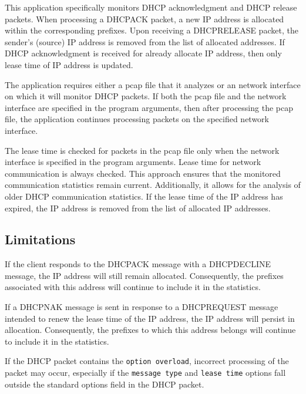 \documentclass[a4paper, 11pt, a4paper]{article}
\begin{document}
\noindent This application specifically monitors DHCP acknowledgment and DHCP release packets. When processing a DHCPACK packet, 
a new IP address is allocated within the corresponding prefixes. Upon receiving a DHCPRELEASE packet, the sender's (source) IP address is removed from the list of allocated addresses.
If DHCP acknowledgment is received for already allocate IP address, then only lease time of IP address is updated.

\bigskip

\noindent The application requires either a pcap file that it analyzes or an network interface on which it will monitor DHCP packets. 
If both the pcap file and the network interface are specified in the program arguments, then after processing the pcap file, the application continues processing packets on the specified network interface.

\bigskip

\noindent The lease time is checked for packets in the pcap file only when the network interface is specified in the program arguments. 
Lease time for network communication is always checked. 
This approach ensures that the monitored communication statistics remain current. Additionally, it allows for the analysis of older DHCP communication statistics.
If the lease time of the IP address has expired, the IP address is removed from the list of allocated IP addresses.


\subsection{Limitations}

\noindent If the client responds to the DHCPACK message with a DHCPDECLINE message, the IP address will still remain allocated. 
Consequently, the prefixes associated with this address will continue to include it in the statistics.

\bigskip

\noindent If a DHCPNAK message is sent in response to a DHCPREQUEST message intended to renew the lease time of the IP address, the IP address will persist in allocation. 
Consequently, the prefixes to which this address belongs will continue to include it in the statistics.

\bigskip

\noindent If the DHCP packet contains the \texttt{option overload}, incorrect processing of the packet may occur, 
especially if the \texttt{message type} and \texttt{lease time} options fall outside the standard options field in the DHCP packet.
\end{document}
